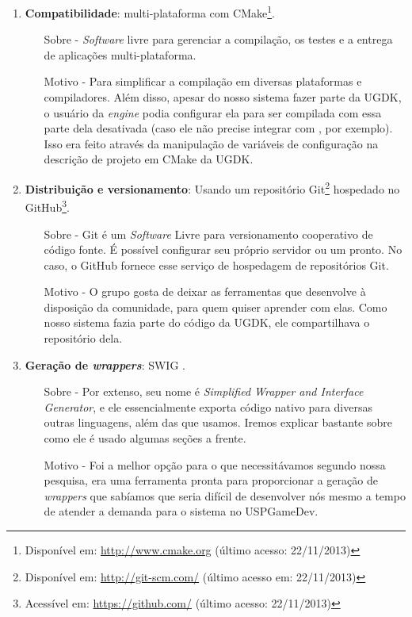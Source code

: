 \begin{enumerate}
    \item \textbf{Compatibilidade}: multi-plataforma com CMake\footnote{Disponível
      em: \url{http://www.cmake.org} (último acesso: 22/11/2013)}.
      \begin{itemize}
        \item[Sobre -] \textit{Software} livre para gerenciar a compilação, os testes
          e a entrega de aplicações multi-plataforma.
        \item[Motivo -] Para simplificar a compilação em diversas plataformas e
          compiladores. Além disso, apesar do nosso sistema fazer parte
          da UGDK, o usuário da \textit{engine} podia configurar ela para ser
          compilada com essa parte dela desativada (caso ele não precise integrar
          com , por exemplo). Isso era feito através da manipulação de
          variáveis de configuração na descrição de projeto em CMake da UGDK.
      \end{itemize}

    \item \textbf{Distribuição e versionamento}: Usando um repositório
      Git\footnote{Disponível em: \url{http://git-scm.com/} (último acesso em: 22/11/2013)}
      hospedado no GitHub\footnote{ Acessível em: \url{https://github.com/} (último
      acesso: 22/11/2013)}.
      \begin{itemize}
        \item[Sobre -] Git é um \textit{Software} Livre para versionamento cooperativo
          de código fonte. É possível configurar seu próprio servidor ou um pronto. No
          caso, o GitHub fornece esse serviço de hospedagem de repositórios Git.
        \item[Motivo -] O grupo gosta de deixar as ferramentas que desenvolve à
          disposição da comunidade, para quem quiser aprender com elas. Como nosso
          sistema fazia parte do código da UGDK, ele compartilhava o repositório dela.
      \end{itemize}

    \item \textbf{Geração de \textit{wrappers}}: SWIG \cite{swig:00}.
      \begin{itemize}
        \item[Sobre -] Por extenso, seu nome é \emph{Simplified Wrapper and
          Interface Generator}, e ele essencialmente exporta código nativo
          para diversas outras linguagens, além das que usamos. Iremos explicar
          bastante sobre como ele é usado algumas seções a frente.
        \item[Motivo -] Foi a melhor opção para o que necessitávamos segundo
          nossa pesquisa, era uma ferramenta pronta para proporcionar a
          geração de \textit{wrappers} que sabíamos que seria difícil de
          desenvolver nós mesmo a tempo de atender a demanda para o sistema
          no USPGameDev.
      \end{itemize}


\end{enumerate}
